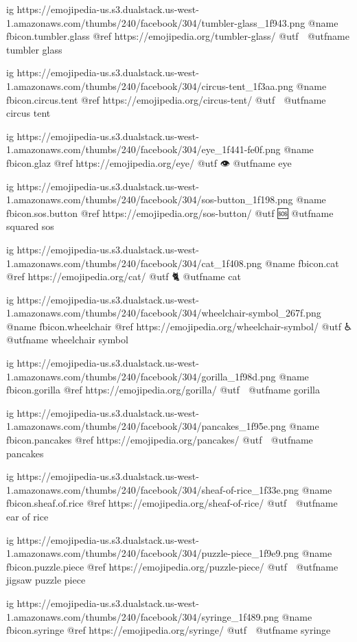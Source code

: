   ig https://emojipedia-us.s3.dualstack.us-west-1.amazonaws.com/thumbs/240/facebook/304/tumbler-glass_1f943.png
  @name fbicon.tumbler.glass
  @ref https://emojipedia.org/tumbler-glass/
  @utf 🥃
  @utfname tumbler glass



  ig https://emojipedia-us.s3.dualstack.us-west-1.amazonaws.com/thumbs/240/facebook/304/circus-tent_1f3aa.png
  @name fbicon.circus.tent
  @ref https://emojipedia.org/circus-tent/
  @utf 🎪
  @utfname circus tent

  ig https://emojipedia-us.s3.dualstack.us-west-1.amazonaws.com/thumbs/240/facebook/304/eye_1f441-fe0f.png
  @name fbicon.glaz
  @ref https://emojipedia.org/eye/
  @utf 👁
  @utfname eye

  ig https://emojipedia-us.s3.dualstack.us-west-1.amazonaws.com/thumbs/240/facebook/304/sos-button_1f198.png
  @name fbicon.sos.button
  @ref https://emojipedia.org/sos-button/
  @utf 🆘
  @utfname squared sos

  ig https://emojipedia-us.s3.dualstack.us-west-1.amazonaws.com/thumbs/240/facebook/304/cat_1f408.png
  @name fbicon.cat
  @ref https://emojipedia.org/cat/
  @utf 🐈
  @utfname cat

  ig https://emojipedia-us.s3.dualstack.us-west-1.amazonaws.com/thumbs/240/facebook/304/wheelchair-symbol_267f.png
  @name fbicon.wheelchair
  @ref https://emojipedia.org/wheelchair-symbol/
  @utf ♿
  @utfname wheelchair symbol

  ig https://emojipedia-us.s3.dualstack.us-west-1.amazonaws.com/thumbs/240/facebook/304/gorilla_1f98d.png
  @name fbicon.gorilla
  @ref https://emojipedia.org/gorilla/
  @utf 🦍
  @utfname gorilla

  ig https://emojipedia-us.s3.dualstack.us-west-1.amazonaws.com/thumbs/240/facebook/304/pancakes_1f95e.png
  @name fbicon.pancakes
  @ref https://emojipedia.org/pancakes/
  @utf 🥞
  @utfname pancakes

  ig https://emojipedia-us.s3.dualstack.us-west-1.amazonaws.com/thumbs/240/facebook/304/sheaf-of-rice_1f33e.png
  @name fbicon.sheaf.of.rice
  @ref https://emojipedia.org/sheaf-of-rice/
  @utf 🌾
  @utfname ear of rice

  ig https://emojipedia-us.s3.dualstack.us-west-1.amazonaws.com/thumbs/240/facebook/304/puzzle-piece_1f9e9.png
  @name fbicon.puzzle.piece
  @ref https://emojipedia.org/puzzle-piece/
  @utf 🧩
  @utfname jigsaw puzzle piece

  ig https://emojipedia-us.s3.dualstack.us-west-1.amazonaws.com/thumbs/240/facebook/304/syringe_1f489.png
  @name fbicon.syringe
  @ref https://emojipedia.org/syringe/
  @utf 💉
  @utfname syringe

